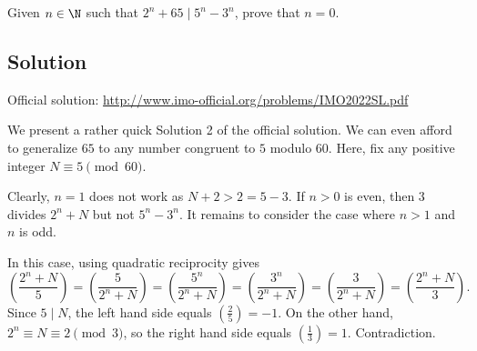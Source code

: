 Given $n \in \N$ such that $2^n + 65 \mid 5^n - 3^n$, prove that $n = 0$.



\subsection*{Solution}

Official solution: \url{http://www.imo-official.org/problems/IMO2022SL.pdf}

We present a rather quick Solution 2 of the official solution.
We can even afford to generalize $65$ to any number congruent to $5$ modulo $60$.
Here, fix any positive integer $N \equiv 5 \pmod{60}$.

Clearly, $n = 1$ does not work as $N + 2 > 2 = 5 - 3$.
If $n > 0$ is even, then $3$ divides $2^n + N$ but not $5^n - 3^n$.
It remains to consider the case where $n > 1$ and $n$ is odd.

In this case, using quadratic reciprocity gives
\[ \left(\frac{2^n + N}{5}\right) = \left(\frac{5}{2^n + N}\right) = \left(\frac{5^n}{2^n + N}\right) = \left(\frac{3^n}{2^n + N}\right) = \left(\frac{3}{2^n + N}\right) = \left(\frac{2^n + N}{3}\right). \]
Since $5 \mid N$, the left hand side equals $\left(\frac{2}{5}\right) = -1$.
On the other hand, $2^n \equiv N \equiv 2 \pmod{3}$, so the right hand side equals $\left(\frac{1}{3}\right) = 1$.
Contradiction.
